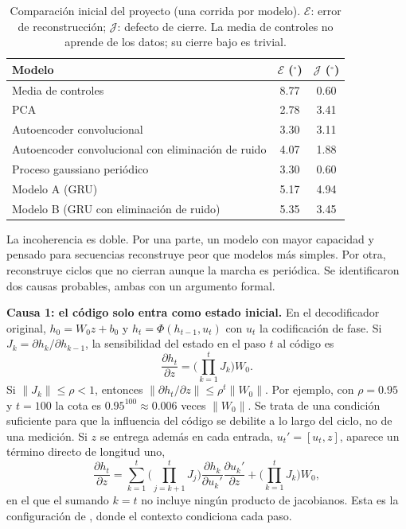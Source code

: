 \documentclass[11pt,a4paper]{article}
\newcommand{\gr}{$^{\circ}$}
\begin{document}
\begin{table}[h]
\centering\small
\begin{tabular}{lcc}
\toprule
Modelo & $\mathcal E$ (\gr) & $\mathcal J$ (\gr) \\
\midrule
Media de controles & 8.77 & 0.60 \\
PCA & 2.78 & 3.41 \\
Autoencoder convolucional & 3.30 & 3.11 \\
Autoencoder convolucional con eliminación de ruido & 4.07 & 1.88 \\
Proceso gaussiano periódico & 3.30 & 0.60 \\
Modelo A (GRU) & 5.17 & 4.94 \\
Modelo B (GRU con eliminación de ruido) & 5.35 & 3.45 \\
\bottomrule
\end{tabular}
\caption{Comparación inicial del proyecto (una corrida por modelo). $\mathcal E$: error de reconstrucción; $\mathcal J$: defecto de cierre. La media de controles no aprende de los datos; su cierre bajo es trivial.}
\label{tab:inicial}
\end{table}

La incoherencia es doble. Por una parte, un modelo con mayor capacidad y pensado para secuencias reconstruye peor que modelos más simples. Por otra, reconstruye ciclos que no cierran aunque la marcha es periódica. Se identificaron dos causas probables, ambas con un argumento formal.

\textbf{Causa 1: el código solo entra como estado inicial.} En el decodificador original, $h_0=W_0z+b_0$ y $h_t=\Phi(h_{t-1},u_t)$ con $u_t$ la codificación de fase. Si $J_k=\partial h_k/\partial h_{k-1}$, la sensibilidad del estado en el paso $t$ al código es
\begin{equation}
\frac{\partial h_t}{\partial z}=\Big(\prod_{k=1}^{t}J_k\Big)W_0 .
\end{equation}
Si $\|J_k\|\le\rho<1$, entonces $\|\partial h_t/\partial z\|\le\rho^{t}\|W_0\|$. Por ejemplo, con $\rho=0.95$ y $t=100$ la cota es $0.95^{100}\approx 0.006$ veces $\|W_0\|$. Se trata de una condición suficiente para que la influencia del código se debilite a lo largo del ciclo, no de una medición. Si $z$ se entrega además en cada entrada, $u_t'=[u_t,z]$, aparece un término directo de longitud uno,
\begin{equation}
\frac{\partial h_t}{\partial z}=\sum_{k=1}^{t}\Big(\prod_{j=k+1}^{t}J_j\Big)\frac{\partial h_k}{\partial u_k'}\frac{\partial u_k'}{\partial z}+\Big(\prod_{k=1}^{t}J_k\Big)W_0,
\end{equation}
en el que el sumando $k=t$ no incluye ningún producto de jacobianos. Esta es la configuración de \cite{cho2014}, donde el contexto condiciona cada paso.
\end{document}
